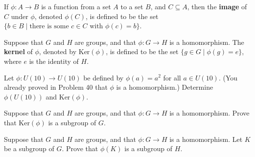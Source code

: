 \begin{definition}
If \(\phi : A \longrightarrow B \) is a function from a set \(A\) to a set \(B\), and \(C \subseteq A\), then the \textbf{image} of \(C\) under \(\phi\), denoted \(\phi(C)\), is defined to be the set \(\{b \in B \mid \mbox{there is some } c \in C \mbox{ with } \phi(c) = b \}\).
\end{definition}

\begin{definition}
Suppose that \(G\) and \(H\) are groups, and that \(\phi : G \longrightarrow H\) is a homomorphism. The \textbf{kernel} of \(\phi\), denoted by \(\mbox{Ker}( \phi )\), is defined to be the
set \(\{g \in G \mid \phi(g) = e \} \), where \(e\) is the identity of \(H\).
\begin{annotation}
\end{annotation}
\end{definition}

\begin{problem}
Let \(\phi : U(10) \longrightarrow U(10) \) be defined by \(\phi(a) = a^2\) for all \(a \in U(10)\). (You already proved in Problem 40 that \(\phi\) is a homomorphism.) Determine \(\phi(U(10))\) and \(\mbox{Ker}(\phi)\).
\end{problem}

\begin{problem}\label{prob:kernelsubgp}
Suppose that \(G\) and \(H\) are groups, and that \(\phi : G \longrightarrow H\) is a homomorphism. Prove that \(\mbox{Ker}(\phi)\) is a subgroup of \(G\).
\begin{annotation}
\end{annotation}
\end{problem}

\begin{problem}\label{prob:imagesubgp}
Suppose that \(G\) and \(H\) are groups, and that \(\phi : G \longrightarrow H\) is a homomorphism. Let \(K\) be a subgroup of \(G\). Prove that \(\phi(K)\) is a subgroup of \(H\).
\begin{annotation}
\end{annotation}
\end{problem}

